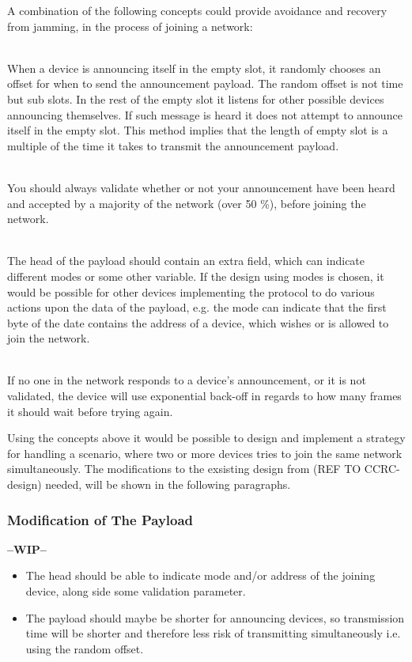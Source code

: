 A combination of the following concepts could provide avoidance and recovery from jamming, in the process of joining a network: 
\begin{description}[labelindent=\parindent]
    \item[Random Offset]\hfill\\
    When a device is announcing itself in the empty slot, it randomly chooses an offset for when to send the announcement payload.
    The random offset is not time but sub slots. 
    In the rest of the empty slot it listens for other possible devices announcing themselves.
    If such message is heard it does not attempt to announce itself in the empty slot.
    This method implies that the length of empty slot is a multiple of the time it takes to transmit the announcement payload.
    \item[Validation]\hfill\\
    You should always validate whether or not your announcement have been heard and accepted by a majority of the network (over 50 \%), before joining the network.
    \item[Payload Mode]\hfill\\
    The head of the payload should contain an extra field, which can indicate different modes or some other variable.
    If the design using modes is chosen, it would be possible for other devices implementing the protocol to do various actions upon the data of the payload, e.g. the mode can indicate that the first byte of the date contains the address of a device, which wishes or is allowed to join the network.
    \item[Exponential Back-off]\hfill\\ 
    If no one in the network responds to a device's announcement, or it is not validated, the device will use exponential back-off in regards to how many frames it should wait before trying again.
\end{description} 
\noindent
Using the concepts above it would be possible to design and implement a strategy for handling a scenario, where two or more devices tries to join the same network simultaneously.
The modifications to the exsisting design from (REF TO CCRC-design) needed, will be shown in the following paragraphs.

\subsubsection{Modification of The Payload} %
\label{ssub:modification_of_the_payload}
\textbf{--WIP--}
\begin{itemize}
    \item The head should be able to indicate mode and/or address of the joining device, along side some validation parameter.
    \item The payload should maybe be shorter for announcing devices, so transmission time will be shorter and therefore less risk of transmitting simultaneously i.e. using the random offset.
\end{itemize}


